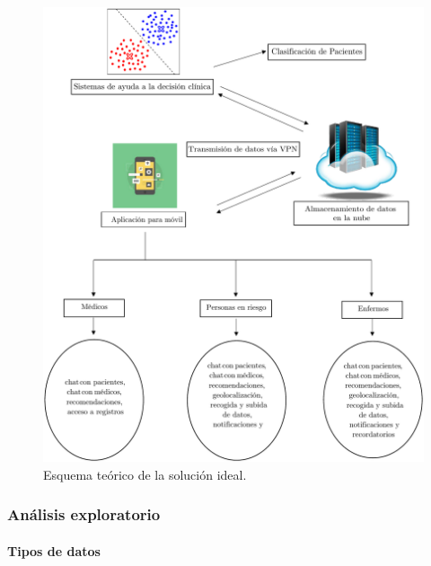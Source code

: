 \documentclass{article}
\newcommand{\subsubsubsection}[1]{\paragraph{#1}\mbox{}\\}
\begin{document}
\begin{figure}[h]
\centering
\includegraphics[width = \linewidth]{../images/esquemaideal.pdf}
\caption{Esquema teórico de la solución ideal.}
\end{figure}

\clearpage
\subsubsection{Análisis exploratorio}
\subsubsubsection{Tipos de datos}
\end{document}
